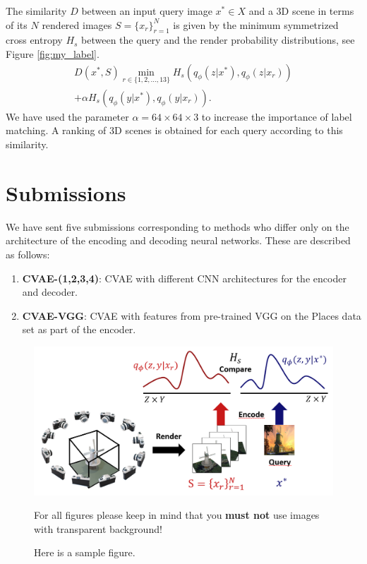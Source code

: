 The similarity $D$ between an input query image $x^*\in X$ and a 3D scene in terms of its $N$ rendered images $S = \{x_r\}_{r=1}^{N}$ is given by the minimum symmetrized cross entropy $H_s$ between the query and the render probability distributions, see Figure \ref{fig:my_label}.
\begin{multline}
 D(x^*, S)\min_{r\in\{1,2,\ldots,13\} }H_s(q_\phi(z|x^*),q_\phi(z|x_{r}))\\
+\alpha H_s(q_\phi(y|x^*),q_\phi(y|x_{r})).
\end{multline}
We have used the parameter $\alpha = 64\times 64 \times 3$ to increase the importance of label matching. A ranking of 3D scenes is obtained for each query according to this similarity.
\section{Submissions}
We have sent five submissions corresponding to methods who differ only on the architecture of the encoding and decoding neural networks. These are described as follows:
\begin{enumerate}
    \item \textbf{CVAE-(1,2,3,4)}: CVAE with different CNN architectures for the encoder and decoder.
    \item \textbf{CVAE-VGG}: CVAE with features from pre-trained VGG \cite{gkallia2017keras_places365} on the Places data set \cite{Zhou2018} as part of the encoder.
    
\end{enumerate}





\begin{figure}[htb]
  \centering
  \includegraphics[width=.8\linewidth]{comparison2.png}
  \parbox[t]{.9\columnwidth}{\relax
           For all figures please keep in mind that you \textbf{must not}
           use images with transparent background! 
           }
  \caption{\label{fig:firstExample}
           Here is a sample figure.}
\end{figure}



